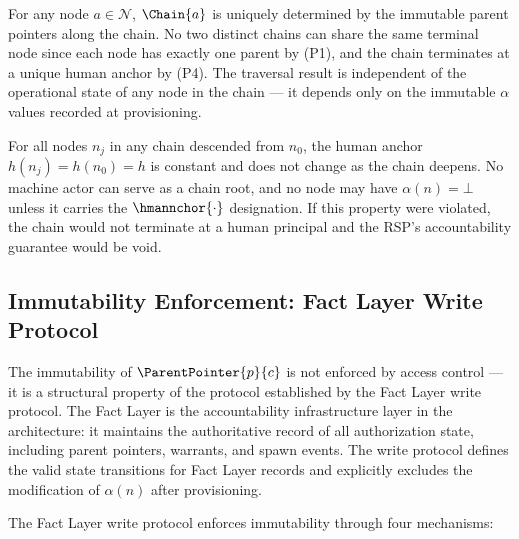 \begin{cor}
\label{cor:chain-uniqueness}
For any node $a \in \mathcal{N}$, $\Chain{a}$ is uniquely determined by the immutable parent pointers along the chain. No two distinct chains can share the same terminal node since each node has exactly one parent by (P1), and the chain terminates at a unique human anchor by (P4). The traversal result is independent of the operational state of any node in the chain — it depends only on the immutable $\alpha$ values recorded at provisioning.
\end{cor}

\begin{cor}
\label{cor:non-collapsing-anchor}
For all nodes $n_j$ in any chain descended from $n_0$, the human anchor $h(n_j) = h(n_0) = h$ is constant and does not change as the chain deepens. No machine actor can serve as a chain root, and no node may have $\alpha(n) = \bot$ unless it carries the $\hmannchor{\cdot}$ designation. If this property were violated, the chain would not terminate at a human principal and the RSP's accountability guarantee would be void.
\end{cor}

\subsection{Immutability Enforcement: Fact Layer Write Protocol}
\label{sec:fact-layer-write-protocol}

The immutability of $\ParentPointer{p}{c}$ is not enforced by access control — it is a structural property of the protocol established by the Fact Layer write protocol. The Fact Layer is the accountability infrastructure layer in the \bxthree{} architecture: it maintains the authoritative record of all authorization state, including parent pointers, warrants, and spawn events. The write protocol defines the valid state transitions for Fact Layer records and explicitly excludes the modification of $\alpha(n)$ after provisioning.

The Fact Layer write protocol enforces immutability through four mechanisms:

